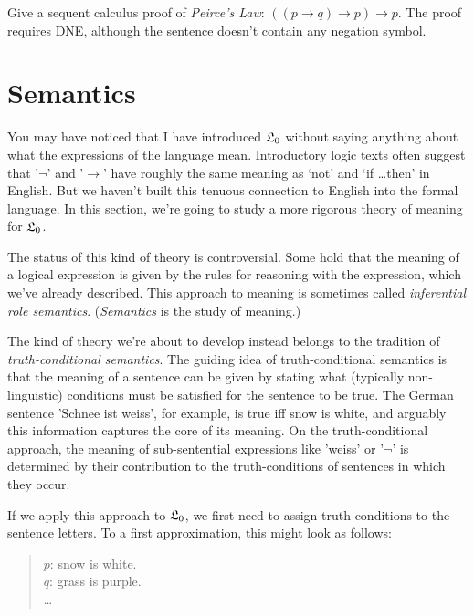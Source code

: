 
\begin{exercise}
  Give a sequent calculus proof of \emph{Peirce's Law}: $((p \to q) \to p) \to p$.
  The proof requires DNE, although the sentence doesn't contain any negation symbol.
\end{exercise}



\section{Semantics}\label{sec:semantics0}


You may have noticed that I have introduced $\mathfrak{L}_0$ without
saying anything about what the expressions of the language mean.
Introductory logic texts often suggest that '$\neg$' and '$\to$'
have roughly the same meaning as `not' and `if \ldots then' in English.
But we haven't built this tenuous connection to English into the formal language.
In this section,
we're going to study a more rigorous theory of meaning for $\mathfrak{L}_0$.

The status of this kind of theory is controversial.
Some hold that
the meaning of a logical expression is given by
the rules for reasoning with the expression,
which we've already described.
This approach to meaning is sometimes called
\textit{inferential role semantics}.
(\textit{Semantics} is the study of meaning.)

The kind of theory we're about to develop instead belongs to the tradition of \textit{truth-conditional semantics}.
The guiding idea of truth-conditional semantics is that
the meaning of a sentence can be given by
stating what (typically non-linguistic) conditions
must be satisfied for the sentence to be true.
The German sentence 'Schnee ist weiss', for example, is true iff snow is white,
and arguably this information captures the core of its meaning.
On the truth-conditional approach,
the meaning of sub-sentential expressions like 'weiss' or '$\neg$' is determined by
their contribution to the truth-conditions of sentences in which they occur.

If we apply this approach to $\mathfrak{L}_0$,
we first need to assign truth-conditions to the sentence letters.
To a first approximation,
this might look as follows:

\begin{quote}
$p$: snow is white.\\
$q$: grass is purple.\\
\ldots
\end{quote}

